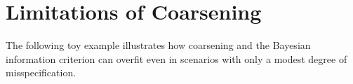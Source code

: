 \section{Limitations of Coarsening}


The following toy example illustrates how coarsening and the Bayesian information criterion can overfit even in scenarios with only a modest degree of misspecification.

